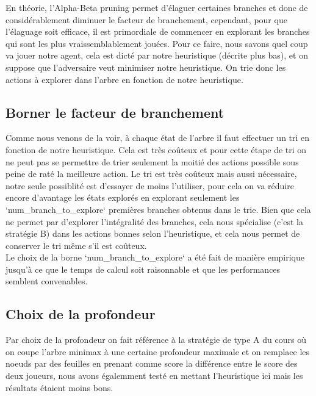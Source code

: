 \documentclass[a4paper,11pt,titlepage,leqno]{article}
\begin{document}
En théorie, l'Alpha-Beta pruning permet d'élaguer certaines branches et donc de considérablement diminuer le facteur de branchement, cependant, pour que l'élaguage soit efficace, il est primordiale de commencer en explorant les branches qui sont les plus vraissemblablement jouées. Pour ce faire, nous savons quel coup va jouer notre agent, cela est dicté par notre heuristique (décrite plus bas), et on suppose que l'adversaire veut minimiser notre heuristique. On trie donc les actions à explorer dans l'arbre en fonction de notre heuristique.

\subsection{Borner le facteur de branchement}

Comme nous venons de la voir, à chaque état de l'arbre il faut effectuer un tri en fonction de notre heuristique. Cela est très coûteux et pour cette étape de tri on ne peut pas se permettre de trier seulement la moitié des actions possible sous peine de raté la meilleure action. Le tri est très coûteux mais aussi nécessaire, notre seule possiblité est d'essayer de moins l'utiliser, pour cela on va réduire encore d'avantage les états explorés en explorant seulement les `num\_branch\_to\_explore` premières branches obtenus dans le trie. Bien que cela ne permet par d'explorer l'intégralité des branches, cela nous spécialise (c'est la stratégie B) dans les actions bonnes selon l'heuristique, et cela nous permet de conserver le tri même s'il est coûteux.\\

Le choix de la borne `num\_branch\_to\_explore` a été fait de manière empirique jusqu'à ce que le temps de calcul soit raisonnable et que les performances semblent convenables.\\


\subsection{Choix de la profondeur}

Par choix de la profondeur on fait référence à la stratégie de type A du cours où on coupe l'arbre minimax à une certaine profondeur maximale et on remplace les noeuds par des feuilles en prenant comme score la différence entre le score des deux joueurs, nous avons égalemment testé en mettant l'heuristique ici mais les résultats étaient moins bons.
\end{document}

